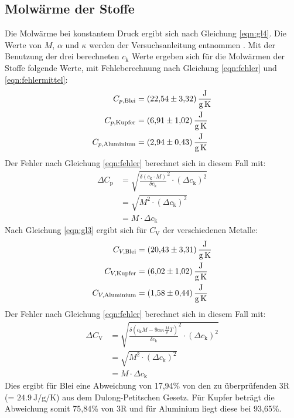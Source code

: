 \subsection{Molwärme der Stoffe}
\label{sec:Molwärme}
Die Molwärme bei konstantem Druck ergibt sich nach Gleichung \eqref{eqn:gl4}.
Die Werte von $M$, $\alpha$ und $\kappa$ werden der Versuchsanleitung entnommen \cite{V201}.
Mit der Benutzung der drei berechneten $c_\text{k}$ Werte ergeben sich für die Molwärmen der Stoffe folgende Werte, mit Fehleberechnung nach Gleichung \eqref{eqn:fehler} und \eqref{eqn:fehlermittel}:
\begin{align*}
  C_{p,\text{Blei}} &= \SI{22,54 \pm 3.32}{\joule\per\gram\per\kelvin}\\
  C_{p,\text{Kupfer}} &= \SI{6,91 \pm 1,02}{\joule\per\gram\per\kelvin}\\
  C_{p,\text{Aluminium}} &= \SI{2,94 \pm 0,43}{\joule\per\gram\per\kelvin}
\end{align*}
Der Fehler nach Gleichung \eqref{eqn:fehler} berechnet sich in diesem Fall mit:
\begin{align*}
  \Delta C_\text{p} &= \sqrt{\frac{\delta (c_\text{k} \cdot M)}{\delta c_\text{k}}^2 \cdot (\Delta c_\text{k})^2} \\
  &= \sqrt{M^2 \cdot (\Delta c_\text{k})^2}\\
  &= M \cdot \Delta c_\text{k}
\end{align*}
Nach Gleichung \eqref{eqn:gl3} ergibt sich für $C_\text{V}$ der verschiedenen Metalle:
\begin{align*}
  C_{V,\text{Blei}} &= \SI{20,43 \pm 3.31}{\joule\per\gram\per\kelvin}\\
  C_{V,\text{Kupfer}} &= \SI{6,02\pm 1,02}{\joule\per\gram\per\kelvin}\\
  C_{V,\text{Aluminium}} &= \SI{1,58 \pm 0,44}{\joule\per\gram\per\kelvin}
\end{align*}
Der Fehler nach Gleichung \eqref{eqn:fehler} berechnet sich in diesem Fall mit:
\begin{align*}
  \Delta C_\text{V} &= \sqrt{\frac{\delta (c_\text{k} M - 9 \alpha \kappa \frac{M}{\rho}T)}{\delta c_\text{k}}^2 \cdot (\Delta c_\text{k})^2} \\
  &= \sqrt{M^2 \cdot (\Delta c_\text{k})^2}\\
  &= M \cdot \Delta c_\text{k}
\end{align*}
Dies ergibt für Blei eine Abweichung von 17,94\% von den zu überprüfenden 3R (= $\SI{24,9}{\joule\per\gram\per\kelvin}$) aus dem Dulong-Petitschen Gesetz.
Für Kupfer beträgt die Abweichung somit 75,84\% von 3R und für Aluminium liegt diese bei 93,65\%.
